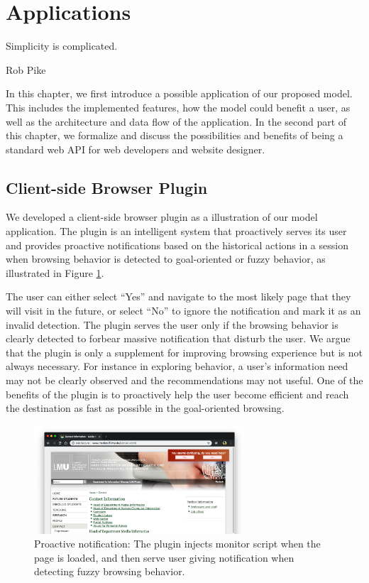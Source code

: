 \section{Applications}
\label{ch:app}

\epigraph{Simplicity is complicated.}{Rob Pike}

In this chapter, we first introduce a possible application of our proposed model.
This includes the implemented features, how the model could benefit a user, 
as well as the architecture and data flow of the application.
In the second part of this chapter, we formalize and discuss 
the possibilities and benefits of being a standard web API for web developers 
and website designer.

\subsection{Client-side Browser Plugin}
\label{sec:plugin}

We developed a client-side browser plugin as a illustration of our model application.
The plugin is an intelligent system that proactively serves its user
and provides proactive notifications based on the historical actions in a session
when browsing behavior is detected to goal-oriented or fuzzy behavior, 
as illustrated in Figure \ref{fig:proactive-noti}.

The user can either select ``Yes'' and navigate to the most likely page that they 
will visit in the future, or select ``No'' to ignore the notification and mark it as an invalid detection.
The plugin serves the user only if the browsing behavior is clearly detected 
to forbear massive notification that disturb the user. 
We argue that the plugin is only a supplement for improving
browsing experience but is not always necessary. For instance in exploring behavior, 
a user's information need may not be clearly observed and the recommendations may not 
useful. 
One of the benefits of the plugin is to proactively help the user become efficient
and reach the destination as fast as possible in the goal-oriented browsing.

\begin{figure}[H]
    \centering
    \includegraphics[width=0.7\textwidth]{figures/proactive-noti}
    \caption{Proactive notification:
    The plugin injects monitor script when the page is loaded, and then serve user giving
    notification when detecting fuzzy browsing behavior.}
    \label{fig:proactive-noti}
\end{figure}

